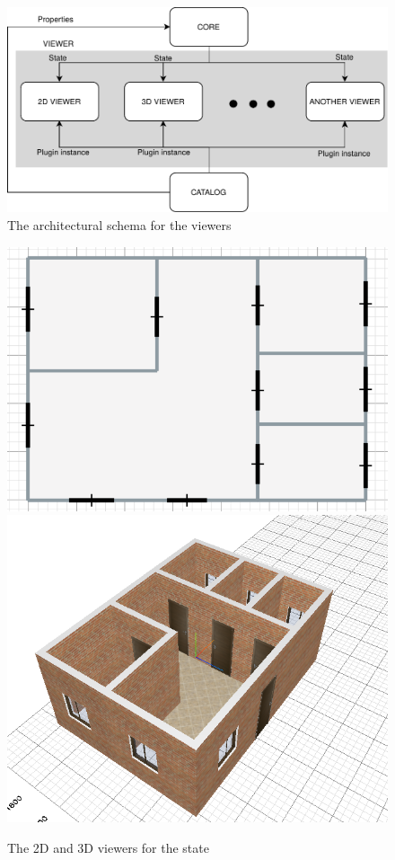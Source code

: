 \begin{figure}[htb]
\centering
\includegraphics[width=\linewidth]{contents/images/diagramma-visualizzatori}

\caption{The architectural schema for the viewers}
\label{fig_viewers}
\end{figure}

\begin{figure}[htb]
\centering
\includegraphics[width=0.45\linewidth]{contents/images/2d-viewer}
\includegraphics[width=0.45\linewidth]{contents/images/3d-viewer}
\caption{The 2D and 3D viewers for the state}
\label{fig_viewer}
\end{figure}


